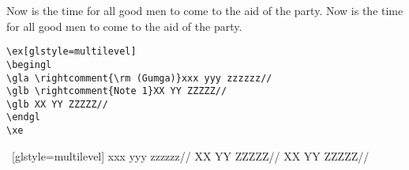 \documentclass{article}
\begin{document}
Now is the time for all good men to come to the aid of the party.
Now is the time for all good men to come to the aid of the party.

\begin{verbatim}\ex[glstyle=multilevel]
\begingl
\gla \rightcomment{\rm (Gumga)}xxx yyy zzzzzz//
\glb \rightcomment{Note 1}XX YY ZZZZZ//
\glb XX YY ZZZZZ//
\endgl
\xe\end{verbatim}

\ex~[glstyle=multilevel]
\begingl
\gla {}xxx yyy zzzzzz//
\glb {}XX YY ZZZZZ//
\glb XX YY ZZZZZ//
\endgl
\xe
\end{document}
